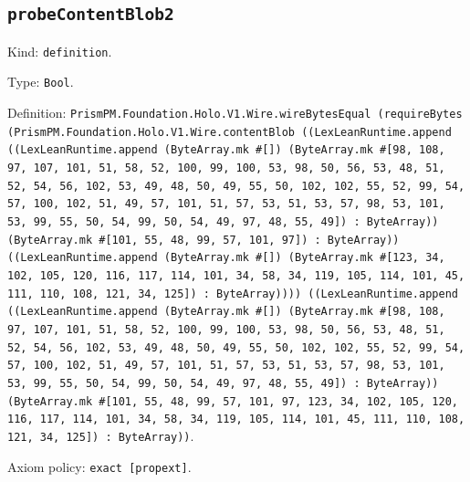 \documentclass[11pt]{article}
\begin{document}
\subsection*{\texttt{probeContentBlob2}}
\noindent Kind: \texttt{definition}.\par
\noindent Type: \texttt{Bool}.\par
\noindent Definition: \texttt{PrismPM.Foundation.Holo.V1.Wire.wireBytesEqual (requireBytes (PrismPM.Foundation.Holo.V1.Wire.contentBlob ((LexLeanRuntime.append ((LexLeanRuntime.append (ByteArray.mk \#[]) (ByteArray.mk \#[98, 108, 97, 107, 101, 51, 58, 52, 100, 99, 100, 53, 98, 50, 56, 53, 48, 51, 52, 54, 56, 102, 53, 49, 48, 50, 49, 55, 50, 102, 102, 55, 52, 99, 54, 57, 100, 102, 51, 49, 57, 101, 51, 57, 53, 51, 53, 57, 98, 53, 101, 53, 99, 55, 50, 54, 99, 50, 54, 49, 97, 48, 55, 49]) : ByteArray)) (ByteArray.mk \#[101, 55, 48, 99, 57, 101, 97]) : ByteArray)) ((LexLeanRuntime.append (ByteArray.mk \#[]) (ByteArray.mk \#[123, 34, 102, 105, 120, 116, 117, 114, 101, 34, 58, 34, 119, 105, 114, 101, 45, 111, 110, 108, 121, 34, 125]) : ByteArray)))) ((LexLeanRuntime.append ((LexLeanRuntime.append (ByteArray.mk \#[]) (ByteArray.mk \#[98, 108, 97, 107, 101, 51, 58, 52, 100, 99, 100, 53, 98, 50, 56, 53, 48, 51, 52, 54, 56, 102, 53, 49, 48, 50, 49, 55, 50, 102, 102, 55, 52, 99, 54, 57, 100, 102, 51, 49, 57, 101, 51, 57, 53, 51, 53, 57, 98, 53, 101, 53, 99, 55, 50, 54, 99, 50, 54, 49, 97, 48, 55, 49]) : ByteArray)) (ByteArray.mk \#[101, 55, 48, 99, 57, 101, 97, 123, 34, 102, 105, 120, 116, 117, 114, 101, 34, 58, 34, 119, 105, 114, 101, 45, 111, 110, 108, 121, 34, 125]) : ByteArray))}.\par
\noindent Axiom policy: \texttt{exact [propext]}.\par
\end{document}
